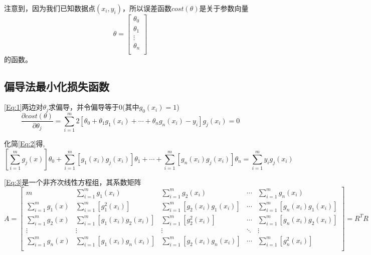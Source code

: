 \documentclass[withoutpreface]{cumcmthesis}
\begin{document}
注意到，因为我们已知数据点$(x_i,y_i)$，所以误差函数$cost(\theta)$是关于参数向量$$\theta=\begin{bmatrix}
    \theta_0 \\
    \theta_1 \\ 
    \vdots \\ 
    \theta_n \\
\end{bmatrix}$$的函数。


\subsection{偏导法最小化损失函数}
\cref{Eq:1}两边对$\theta_j$求偏导，并令偏导等于0(其中$g_0(x_i)=1$)
\begin{equation}\label{Eq:2}
    \frac{\partial{cost(\theta)}}{\partial{\theta_j}}=\sum \limits_{i=1}^m 2[\theta_0 + \theta_1g_1(x_i) +\cdots+\theta_n g_n(x_i)-y_i]g_j(x_i)=0
\end{equation}

化简\cref{Eq:2}得,
\begin{equation}\label{Eq:3}
    [\sum \limits_{i=1}^m g_j(x)]\theta_0 + \sum \limits_{i=1}^m [g_1(x_i)g_j(x_i)]\theta _1+\cdots+ \sum \limits_{i=1}^m [g_n(x_i)g_j(x_i)]\theta _n = \sum \limits_{i=1}^m y_ig_j(x_i)
\end{equation}

\cref{Eq:3}是一个非齐次线性方程组，其系数矩阵
\begin{equation}
    A=\begin{bmatrix}\label{Eq:5}
        m & \sum \limits_{i=1}^m g_1(x_i) &\sum \limits_{i=1}^m g_2(x_i) &\cdots& \sum \limits_{i=1}^m g_n(x_i) \\ 
        \sum \limits_{i=1}^m g_1(x) & \sum \limits_{i=1}^m [g_1^2(x_i)] & \sum \limits_{i=1}^m [g_2(x_i)g_1(x_i)] &  \cdots & \sum \limits_{i=1}^m [g_n(x_i)g_1(x_i)]\\ 
        \sum \limits_{i=1}^m g_2(x) & \sum \limits_{i=1}^m [g_1(x_i)g_2(x_i)] & \sum \limits_{i=1}^m [g_2^2(x_i)] &  \cdots & \sum \limits_{i=1}^m [g_n(x_i)g_2(x_i)] \\ 
        \vdots & \vdots &\vdots &\ddots &\vdots \\ 
        \sum \limits_{i=1}^m g_n(x) & \sum \limits_{i=1}^m [g_1(x_i)g_n(x_i)] & \sum \limits_{i=1}^m [g_2(x_i)g_n(x_i)] &  \cdots & \sum \limits_{i=1}^m [g_n^2(x_i)] \\ 
    \end{bmatrix} = R^T R
\end{equation}
\end{document}

